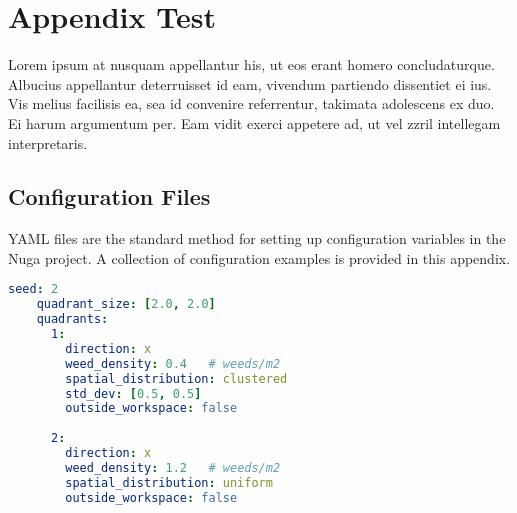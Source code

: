 \chapter{Appendix Test}\label{sec:appendix}
Lorem ipsum at nusquam appellantur his, ut eos erant homero
concludaturque. Albucius appellantur deterruisset id eam, vivendum
partiendo dissentiet ei ius. Vis melius facilisis ea, sea id convenire
referrentur, takimata adolescens ex duo. Ei harum argumentum per. Eam
vidit exerci appetere ad, ut vel zzril intellegam interpretaris.


\section{Configuration Files}
YAML files are the standard method for setting up configuration variables in the Nuga project. A collection of configuration examples is provided in this appendix.

\begin{lstlisting}[language=yaml, frame=tb, caption={Weed Infestation World config example}, label={lst:world-yaml}, float=h]
    seed: 2
    quadrant_size: [2.0, 2.0]
    quadrants:
      1:
        direction: x
        weed_density: 0.4   # weeds/m2
        spatial_distribution: clustered
        std_dev: [0.5, 0.5]
        outside_workspace: false
    
      2:
        direction: x
        weed_density: 1.2   # weeds/m2
        spatial_distribution: uniform
        outside_workspace: false
\end{lstlisting}    

